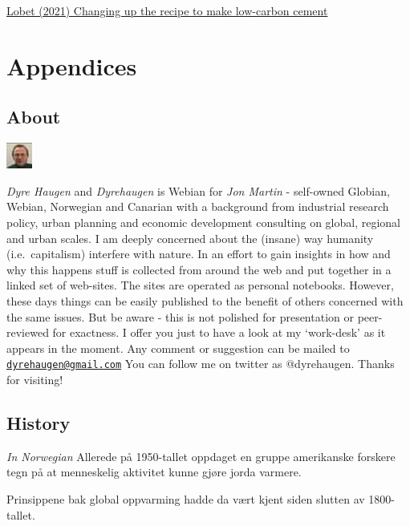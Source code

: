 \documentclass[
]{book}
\begin{document}
\href{https://www.canarymedia.com/articles/clean-industry/changing-up-the-recipe-to-make-low-carbon-cement}{Lobet (2021) Changing up the recipe to make low-carbon cement}

\hypertarget{part-appendices}{%
\part{Appendices}\label{part-appendices}}

\hypertarget{appendix-appendices}{%
\appendix}


\hypertarget{about}{%
\chapter{About}\label{about}}

\includegraphics{fig/me.jpg}

\emph{Dyre Haugen} and \emph{Dyrehaugen} is Webian for \emph{Jon Martin} -
self-owned Globian, Webian, Norwegian and Canarian with
a background from industrial research policy, urban planning and
economic development consulting on global, regional and urban scales.
I am deeply concerned about the (insane) way
humanity (i.e.~capitalism) interfere with nature.
In an effort to gain insights in how and why this happens
stuff is collected from around the web and put together
in a linked set of web-sites.
The sites are operated as personal notebooks.
However, these days things can be easily published to the
benefit of others concerned with the same issues.
But be aware - this is not polished for presentation or
peer-reviewed for exactness.
I offer you just to have a look at my `work-desk' as it appears in the moment.
Any comment or suggestion can be mailed to \href{mailto:dyrehaugen@gmail.com}{\nolinkurl{dyrehaugen@gmail.com}}
You can follow me on twitter as @dyrehaugen.
Thanks for visiting!

\hypertarget{history}{%
\chapter{History}\label{history}}

\emph{In Norwegian}
Allerede på 1950-tallet oppdaget en gruppe amerikanske forskere tegn på at menneskelig aktivitet kunne gjøre jorda varmere.

Prinsippene bak global oppvarming hadde da vært kjent siden slutten av 1800-tallet.
\end{document}
